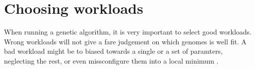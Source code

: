 \section{Choosing workloads}
When running a genetic algorithm, it is very important to select good workloads.
Wrong workloads will not give a fare judgement on which genomes is well fit. A
bad workload might be to biased towards a single or a set of paramters,
neglecting the rest, or even missconfigure them into a local minimum \cite{magic-book-of-ga}.
